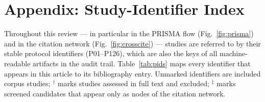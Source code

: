 \documentclass{ieeeaccess}
\begin{document}
\section*{Appendix: Study-Identifier Index}
\label{sec:appendix}

Throughout this review --- in particular in the PRISMA flow
(Fig.~\ref{fig:prisma}) and in the citation network
(Fig.~\ref{fig:crosscite}) --- studies are referred to by their stable
protocol identifiers (P01--P126), which are also the keys of all
machine-readable artifacts in the audit trail.
Table~\ref{tab:pids} maps every identifier that appears in this article
to its bibliography entry. Unmarked identifiers are included corpus
studies; $^{\dagger}$ marks studies assessed in full text and excluded;
$^{\ddagger}$ marks screened candidates that appear only as nodes of the
citation network.
\end{document}
